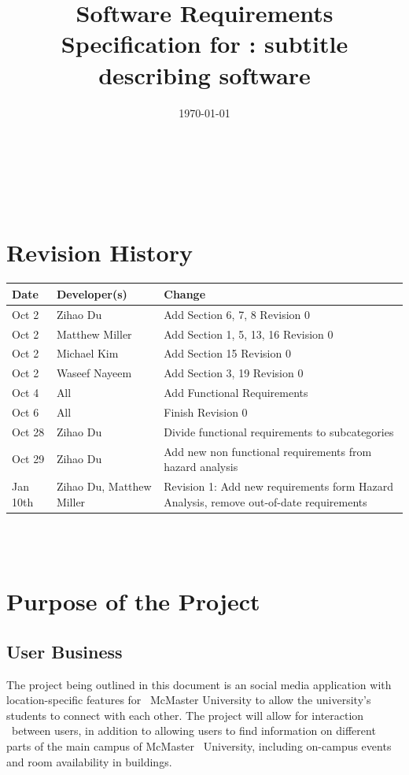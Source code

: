 \documentclass[12pt]{article}
\begin{document}

\title{Software Requirements Specification for \progname: subtitle describing software} 
\author{\authname}
\date{\today}
	
\maketitle

~\newpage


\tableofcontents

~\newpage

\section*{Revision History}

\begin{tabularx}{\textwidth}{p{3cm}p{3cm}X}
\toprule {\textbf{Date}} & {\textbf{Developer(s)}} & {\textbf{Change}}\\
\midrule
Oct 2 & Zihao Du & Add Section 6, 7, 8 Revision 0\\
Oct 2 & Matthew Miller & Add Section 1, 5, 13, 16 Revision 0\\
Oct 2 & Michael Kim & Add Section 15 Revision 0\\
Oct 2 & Waseef Nayeem & Add Section 3, 19 Revision 0\\
Oct 4 & All & Add Functional Requirements\\
Oct 6 & All & Finish Revision 0\\
Oct 28 & Zihao Du & Divide functional requirements to subcategories\\
Oct 29 & Zihao Du & Add new non functional requirements from hazard analysis\\
Jan 10th & Zihao Du, Matthew Miller & Revision 1: Add new requirements form Hazard Analysis, remove out-of-date requirements\\
\bottomrule
\end{tabularx}

~\\

~\newpage
\section{Purpose of the Project}
\subsection{User Business}
\quad The project being outlined in this document is an social media application with location-specific features for \
McMaster University to allow the university's students to connect with each other. The project will allow for interaction \
between users, in addition to allowing users to find information on different parts of the main campus of McMaster \
University, including on-campus events and room availability in buildings.
\end{document}
